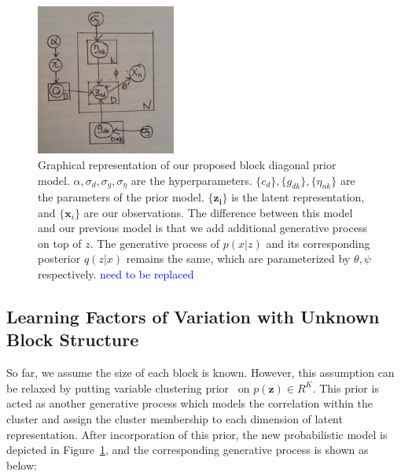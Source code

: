 \begin{figure}[hb]
  \centering
  \includegraphics[width=1.8in]{images/blockmodel.png}
  \caption[]
   {Graphical representation of our proposed block diagonal prior model. $\alpha, \sigma_d, \sigma_g, \sigma_{\eta}$ are the hyperparameters. $\{c_d\}, \{g_{dk}\}, \{\eta_{nk}\}$ are the parameters of the prior model. $\{\mathbf{z_i}\}$ is the latent representation, and $\{\mathbf{x}_i\}$ are our observations. The difference between this model and our previous model is that we add additional generative process on top of $z$. The generative process of $p(x|z)$ and its corresponding posterior $q(z|x)$ remains the same, which are parameterized by $\theta, \psi$ respectively. \textcolor{blue}{need to be replaced}}
  \label{fig:blockprior}
\end{figure}

\subsection{Learning Factors of Variation with Unknown Block Structure}

So far, we assume the size of each block is known. However, this assumption can be relaxed by putting variable clustering prior~\cite{palla2012nonparametric} on $p(\mathbf{z})\in R^K$. This prior is acted as another generative process which models the correlation within the cluster and assign the cluster membership to each dimension of latent representation. After incorporation of this prior, the new probabilistic model is depicted in Figure~\ref{fig:blockprior}, and the corresponding generative process is shown as below: 

